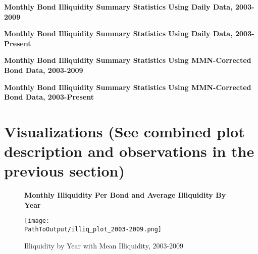 \documentclass{article}
\newcommand*{\PathToOutput}{../output/}%
\begin{document}
\begin{table}[hbt!]
\centering
\textbf{\small Monthly Bond Illiquidity Summary Statistics Using Daily Data, 2003-2009}
\small %
\renewcommand{\arraystretch}{0.92} %

\label{table:illiq_summary_paper}
\end{table}
\FloatBarrier %



\begin{table}[hbt!]
\centering
\textbf{\small Monthly Bond Illiquidity Summary Statistics Using Daily Data, 2003-Present}
\resizebox{\textwidth}{!}{%
    
}
\label{table: illiq_summary_new}
\end{table}
\FloatBarrier %



\begin{table}[hbt!]
\centering
\textbf{\small Monthly Bond Illiquidity Summary Statistics Using MMN-Corrected Bond Data, 2003-2009}
\small %
\renewcommand{\arraystretch}{0.92} %

\label{table:illiq_daily_summary_mmn_paper}
\end{table}
\FloatBarrier %

\begin{table}[hbt!]
\centering
\textbf{\small Monthly Bond Illiquidity Summary Statistics Using MMN-Corrected Bond Data, 2003-Present}
\resizebox{\textwidth}{!}{%
    
}
\label{table: illiq_daily_summary_mmn_new}
\end{table}
\FloatBarrier %


\clearpage
\section{Visualizations  (See combined plot description and observations in the previous section)}

\begin{figure}[hbt!]
\centering
\textbf{\small Monthly Illiquidity Per Bond and Average Illiquidity By Year}
\caption{Illiquidity by Year with Mean Illiquidity, 2003-2009}
  \centering
  \texttt{[image: \\PathToOutput/illiq\_plot\_2003-2009.png]}

\label{fig:illiq_plot_2003-2009}
\end{figure}
\FloatBarrier %
\end{document}
